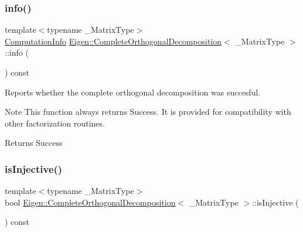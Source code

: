 \subsubsection{\texorpdfstring{info()}{info()}}
{\footnotesize\ttfamily template$<$typename \+\_\+\+Matrix\+Type$>$ \\
\mbox{\hyperlink{group__enums_ga85fad7b87587764e5cf6b513a9e0ee5e}{Computation\+Info}} \mbox{\hyperlink{class_eigen_1_1_complete_orthogonal_decomposition}{Eigen\+::\+Complete\+Orthogonal\+Decomposition}}$<$ \+\_\+\+Matrix\+Type $>$\+::info (\begin{DoxyParamCaption}{ }\end{DoxyParamCaption}) const\hspace{0.3cm}{\ttfamily [inline]}}



Reports whether the complete orthogonal decomposition was succesful. 

\begin{DoxyNote}{Note}
This function always returns {\ttfamily Success}. It is provided for compatibility with other factorization routines. 
\end{DoxyNote}
\begin{DoxyReturn}{Returns}
{\ttfamily Success} 
\end{DoxyReturn}
\mbox{\label{class_eigen_1_1_complete_orthogonal_decomposition_a2740067b81ec3e0ad20a2bea9a5a475f}} 
\subsubsection{\texorpdfstring{isInjective()}{isInjective()}}
{\footnotesize\ttfamily template$<$typename \+\_\+\+Matrix\+Type$>$ \\
bool \mbox{\hyperlink{class_eigen_1_1_complete_orthogonal_decomposition}{Eigen\+::\+Complete\+Orthogonal\+Decomposition}}$<$ \+\_\+\+Matrix\+Type $>$\+::is\+Injective (\begin{DoxyParamCaption}{ }\end{DoxyParamCaption}) const\hspace{0.3cm}{\ttfamily [inline]}}

